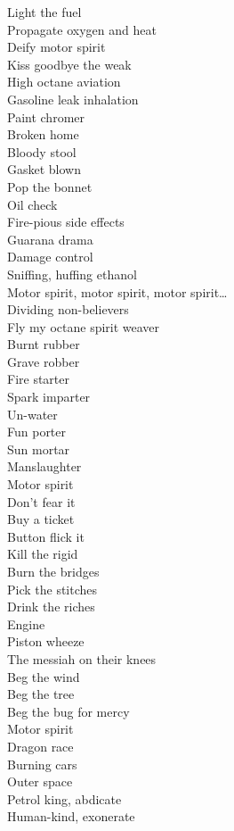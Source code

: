 Light the fuel \\
Propagate oxygen and heat \\
Deify motor spirit \\
Kiss goodbye the weak \\

High octane aviation \\
Gasoline leak inhalation \\
Paint chromer \\
Broken home \\
Bloody stool \\
Gasket blown \\
Pop the bonnet \\
Oil check \\
Fire-pious side effects \\
Guarana drama \\
Damage control \\
Sniffing, huffing ethanol \\

Motor spirit, motor spirit, motor spirit… \\

Dividing non-believers \\
Fly my octane spirit weaver \\

Burnt rubber \\
Grave robber \\
Fire starter \\
Spark imparter \\
Un-water \\
Fun porter \\
Sun mortar \\
Manslaughter \\
Motor spirit \\
Don't fear it \\
Buy a ticket \\
Button flick it \\
Kill the rigid \\
Burn the bridges \\
Pick the stitches \\
Drink the riches \\

Engine  \\
Piston wheeze \\
The messiah on their knees \\
Beg the wind \\
Beg the tree \\
Beg the bug for mercy \\
Motor spirit \\
Dragon race \\
Burning cars \\
Outer space \\
Petrol king, abdicate \\
Human-kind, exonerate \\

